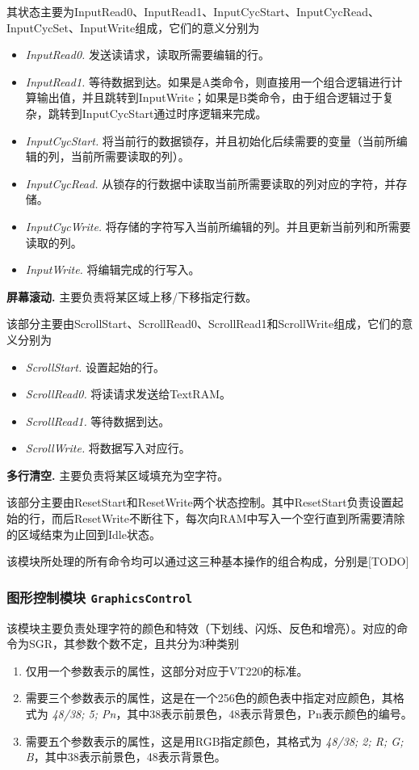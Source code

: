 其状态主要为InputRead0、InputRead1、InputCycStart、InputCycRead、InputCycSet、InputWrite组成，它们的意义分别为

\begin{itemize}
	\item \textit{InputRead0.} 发送读请求，读取所需要编辑的行。
	\item \textit{InputRead1.} 等待数据到达。如果是A类命令，则直接用一个组合逻辑进行计算输出值，并且跳转到InputWrite；如果是B类命令，由于组合逻辑过于复杂，跳转到InputCycStart通过时序逻辑来完成。
	\item \textit{InputCycStart.} 将当前行的数据锁存，并且初始化后续需要的变量（当前所编辑的列，当前所需要读取的列）。
	\item \textit{InputCycRead.} 从锁存的行数据中读取当前所需要读取的列对应的字符，并存储。
	\item \textit{InputCycWrite.} 将存储的字符写入当前所编辑的列。并且更新当前列和所需要读取的列。
	\item \textit{InputWrite.} 将编辑完成的行写入。
\end{itemize}

\textbf{屏幕滚动. }主要负责将某区域上移/下移指定行数。

该部分主要由ScrollStart、ScrollRead0、ScrollRead1和ScrollWrite组成，它们的意义分别为

\begin{itemize}
	\item \textit{ScrollStart.} 设置起始的行。
	\item \textit{ScrollRead0.} 将读请求发送给TextRAM。
	\item \textit{ScrollRead1.} 等待数据到达。
	\item \textit{ScrollWrite.} 将数据写入对应行。
\end{itemize}

\textbf{多行清空. }主要负责将某区域填充为空字符。

该部分主要由ResetStart和ResetWrite两个状态控制。其中ResetStart负责设置起始的行，而后ResetWrite不断往下，每次向RAM中写入一个空行直到所需要清除的区域结束为止回到Idle状态。

该模块所处理的所有命令均可以通过这三种基本操作的组合构成，分别是[TODO]
\subsubsection{图形控制模块 \texttt{GraphicsControl}}
该模块主要负责处理字符的颜色和特效（下划线、闪烁、反色和增亮）。对应的命令为SGR，其参数个数不定，且共分为3种类别
\begin{enumerate}
	\item 仅用一个参数表示的属性，这部分对应于VT220的标准。
	\item 需要三个参数表示的属性，这是在一个256色的颜色表中指定对应颜色，其格式为 {\it 48/38; 5; Pn}，其中38表示前景色，48表示背景色，Pn表示颜色的编号。
	\item 需要五个参数表示的属性，这是用RGB指定颜色，其格式为 {\it 48/38; 2; R; G; B}，其中38表示前景色，48表示背景色。
\end{enumerate}


